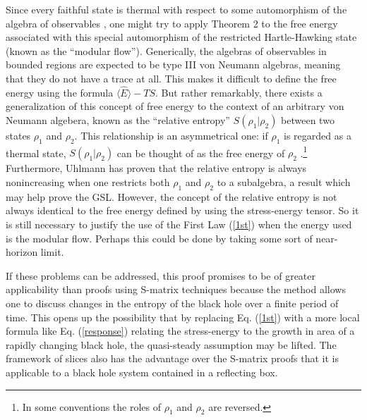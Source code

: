 \documentclass[12pt]{article}
\begin{document}
Since every faithful state is thermal with respect to some automorphism of the algebra of observables \cite{KR}, one might try to apply Theorem 2 to the free energy associated with this special automorphism of the restricted Hartle-Hawking state (known as the ``modular flow'').  Generically, the algebras of observables in bounded regions are expected to be type III von Neumann algebras, meaning that they do not have a trace at all.  This makes it difficult to define the free energy using the formula $\langle \hat{E} \rangle - TS$.  But rather remarkably, there exists a generalization of this concept of free energy to the context of an arbitrary von Neumann algebera, known as the ``relative entropy'' $S(\rho_{1} | \rho_{2})$ between two states $\rho_{1}$ and $\rho_{2}$.  This relationship is an asymmetrical one: if $\rho_{1}$ is regarded as a thermal state, $S(\rho_{1} | \rho_{2})$ can be thought of as the free energy of $\rho_{2}$ \cite{araki75}.\footnote{In some conventions the roles of $\rho_{1}$ and $\rho_{2}$ are reversed.}  Furthermore, Uhlmann \cite{lindblad75} has proven that the relative entropy is always nonincreasing when one restricts both $\rho_{1}$ and $\rho_{2}$ to a subalgebra, a result which may help prove the GSL.  However, the concept of the relative entropy is not always identical to the free energy defined by using the stress-energy tensor.  So it is still necessary to justify the use of the First Law (\ref{1st}) when the energy used is the modular flow.  Perhaps this could be done by taking some sort of near-horizon limit.

If these problems can be addressed, this proof promises to be of greater applicability than proofs using S-matrix techniques because the method allows one to discuss changes in the entropy of the black hole over a finite period of time.  This opens up the possibility that by replacing Eq. (\ref{1st}) with a more local formula like Eq. (\ref{response}) relating the stress-energy to the growth in area of a rapidly changing black hole, the quasi-steady assumption may be lifted.  The framework of slices also has the advantage over the S-matrix proofs that it is applicable to a black hole system contained in a reflecting box.
\end{document}
